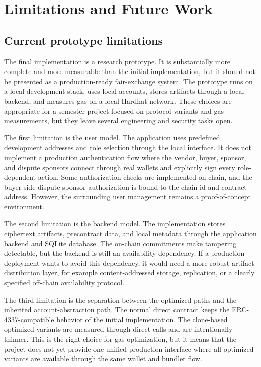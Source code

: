 \chapter{Limitations and Future Work}
\label{chap:limitations-future-work}

\section{Current prototype limitations}

The final implementation is a research prototype. It is substantially more complete and
more measurable than the initial implementation, but it should not be presented as a
production-ready fair-exchange system. The prototype runs on a local development stack,
uses local accounts, stores artifacts through a local backend, and measures gas on a local
Hardhat network. These choices are appropriate for a semester project focused on protocol
variants and gas measurements, but they leave several engineering and security tasks open.

The first limitation is the user model. The application uses predefined development
addresses and role selection through the local interface. It does not implement a
production authentication flow where the vendor, buyer, sponsor, and dispute sponsors
connect through real wallets and explicitly sign every role-dependent action. Some
authorization checks are implemented on-chain, and the buyer-side dispute sponsor
authorization is bound to the chain id and contract address. However, the surrounding user
management remains a proof-of-concept environment.

The second limitation is the backend model. The implementation stores ciphertext artifacts,
precontract data, and local metadata through the application backend and SQLite database.
The on-chain commitments make tampering detectable, but the backend is still an
availability dependency. If a production deployment wants to avoid this dependency, it
would need a more robust artifact distribution layer, for example content-addressed
storage, replication, or a clearly specified off-chain availability protocol.

The third limitation is the separation between the optimized paths and the inherited
account-abstraction path. The normal direct contract keeps the ERC-4337-compatible behavior
of the initial implementation. The clone-based optimized variants are measured through
direct calls and are intentionally thinner. This is the right choice for gas optimization,
but it means that the project does not yet provide one unified production interface where
all optimized variants are available through the same wallet and bundler flow.

